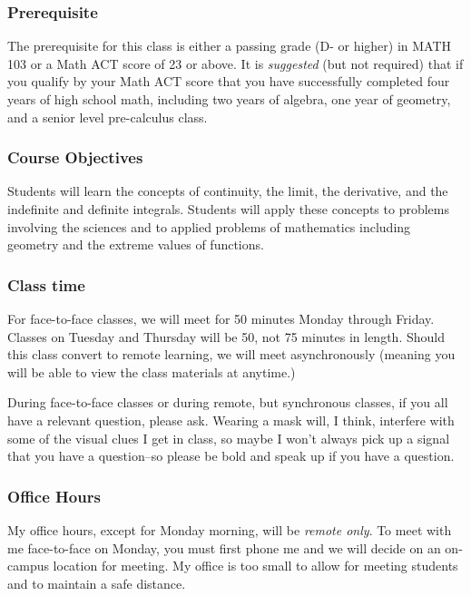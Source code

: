 \documentclass[12pt]{article}
\newcounter{ex}\setcounter{ex}{0}
\begin{document}
\subsubsection*{Prerequisite}

The prerequisite for this class is either a passing grade (D- or higher) in MATH 103 or a Math ACT score of 23 or above.  It is \emph{suggested} (but not required)  that if you qualify by your Math ACT score that you have successfully completed  four years of high school math, including two  years of  algebra, one year of geometry,  and a senior  level pre-calculus class.



\subsubsection*{Course Objectives}

Students will learn the concepts of continuity,  the limit, the derivative, and the indefinite and definite integrals. Students will apply these concepts to problems involving the sciences and to applied problems of mathematics including geometry and the extreme values of functions.







\subsubsection*{Class time}  For face-to-face classes, we will meet for 50 minutes Monday through Friday.  Classes on Tuesday and Thursday will be 50, not 75 minutes in length. Should this class convert to remote learning, we will meet asynchronously (meaning you will be able to view the class materials at anytime.)


During face-to-face classes or during remote, but  synchronous classes, if you all have a relevant question, please ask.  Wearing a mask will, I think, interfere with some of the visual clues I get in class, so maybe I won't always pick up a signal that you have a question--so please be bold and speak up if you have a question.

\subsubsection*{Office Hours} My office hours, except for Monday morning, will be \emph{remote only}.  To meet with me face-to-face on Monday, you must first phone me and we will decide on an on-campus location for meeting.  My office is too small to allow for meeting students and to maintain a safe distance.
\end{document}

